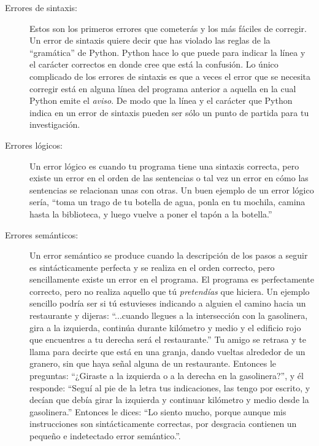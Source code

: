 \begin{description}

\item[Errores de sintaxis:] Estos son los primeros errores que cometerás y los más
fáciles de corregir. Un error de sintaxis quiere decir que has violado las reglas de la
``gramática'' de Python. Python hace lo que puede para indicar la línea y el carácter
correctos en donde cree que está la confusión. Lo único complicado de los errores de
sintaxis es que a veces el error que se necesita corregir está en alguna línea del
programa anterior a aquella en la cual Python emite el {\em aviso}. De modo que la línea
y el carácter que Python indica en un error de sintaxis pueden ser sólo un punto de
partida para tu investigación.  

\item[Errores lógicos:] Un error lógico es cuando tu programa tiene una sintaxis correcta,
pero existe un error en el orden de las sentencias o tal vez un error en cómo las
sentencias se relacionan unas con otras.
Un buen ejemplo de un error lógico sería, ``toma un trago de tu botella de agua, ponla
en tu mochila, camina hasta la biblioteca, y luego vuelve a poner el tapón a la botella.'' 

\item[Errores semánticos:] Un error semántico se produce cuando la descripción de los
pasos a seguir es sintácticamente perfecta y se realiza en el orden correcto, pero
sencillamente existe un error en el programa. El programa es perfectamente correcto, pero
no realiza aquello que tú {\em pretendías} que hiciera. Un ejemplo sencillo podría ser
si tú estuvieses indicando a alguien el camino hacia un restaurante y dijeras:
``...cuando llegues a la intersección con la gasolinera, gira a la izquierda, continúa
durante kilómetro y medio y el edificio rojo que encuentres a tu derecha será el restaurante.''
Tu amigo se retrasa y te llama para decirte que está en una granja, dando vueltas alrededor
de un granero, sin que haya señal alguna de un restaurante.
Entonces le preguntas: ``¿Giraste a la izquierda o a la derecha en la gasolinera?'', y él
responde: ``Seguí al pie de la letra tus indicaciones, las tengo por escrito, y decían
que debía girar la izquierda y continuar kilómetro y medio desde la gasolinera.'' Entonces
le dices: ``Lo siento mucho, porque aunque mis instrucciones son sintácticamente
correctas, por desgracia contienen un pequeño e indetectado error semántico.''.

\end{description}

